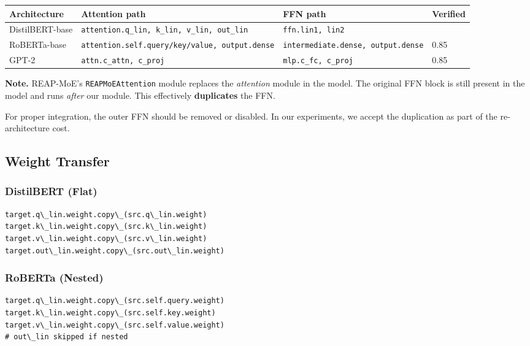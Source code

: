 \begin{table}[H]
\centering
\small
\begin{tabular}{llll}
\toprule
\textbf{Architecture} & \textbf{Attention path} & \textbf{FFN path} & \textbf{Verified} \\
\midrule
DistilBERT-base & \texttt{attention.q\_lin, k\_lin, v\_lin, out\_lin} & \texttt{ffn.lin1, lin2} &  \\
RoBERTa-base & \texttt{attention.self.query/key/value, output.dense} & \texttt{intermediate.dense, output.dense} & 0.85 \\
GPT-2 & \texttt{attn.c\_attn, c\_proj} & \texttt{mlp.c\_fc, c\_proj} & 0.85 \\
\bottomrule
\end{tabular}
\end{table}

\textbf{Note.} REAP-MoE's \texttt{REAPMoEAttention} module replaces the \textit{attention} 
module in the model. The original FFN block is still present in the model 
and runs \textit{after} our module. This effectively \textbf{duplicates} the FFN.

For proper integration, the outer FFN should be removed or disabled. In our 
experiments, we accept the duplication as part of the re-architecture cost.

\subsection{Weight Transfer}

\subsubsection{DistilBERT (Flat)}

\begin{lstlisting}
target.q\_lin.weight.copy\_(src.q\_lin.weight)
target.k\_lin.weight.copy\_(src.k\_lin.weight)
target.v\_lin.weight.copy\_(src.v\_lin.weight)
target.out\_lin.weight.copy\_(src.out\_lin.weight)
\end{lstlisting}

\subsubsection{RoBERTa (Nested)}

\begin{lstlisting}
target.q\_lin.weight.copy\_(src.self.query.weight)
target.k\_lin.weight.copy\_(src.self.key.weight)
target.v\_lin.weight.copy\_(src.self.value.weight)
# out\_lin skipped if nested
\end{lstlisting}


